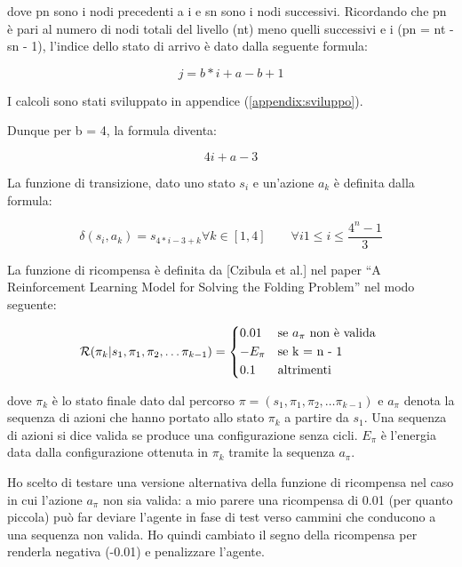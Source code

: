 \documentclass[conference]{IEEEtran}
\begin{document}
dove pn sono i nodi precedenti a i e sn sono i nodi successivi. Ricordando che pn è pari al numero di nodi totali del livello (nt) meno quelli successivi e i (pn = nt - sn - 1), l'indice dello stato di arrivo è dato dalla seguente formula:

\begin{equation}
j = b*i + a - b + 1
\end{equation}

I calcoli sono stati sviluppato in appendice (\ref{appendix:sviluppo}).

Dunque per b = 4, la formula diventa:

\begin{equation}
\tag{Funzione di transizione}
4i + a - 3
\end{equation}

La funzione di transizione, dato uno stato $s_i$ e un'azione $a_k$ è definita dalla formula:

\begin{equation}
\delta(s_i, a_k) = s_{4*i - 3 + k} \forall k \in [1,4] \qquad \forall i 1 \leq i \leq \frac{4^n - 1}{3}
\end{equation}

La funzione di ricompensa è definita da [Czibula et al.] nel paper ``A Reinforcement Learning Model for Solving the Folding Problem'' nel modo seguente:

\begin{equation}
    \label{eq:rew}
    \mathcal{R}(\pi_k| s_1, \pi_1, \pi_2, \dots \pi_{k-1}) =
    \begin{cases*}
      0.01 & se $a_{\pi}$ non è valida \\
      - E_{\pi} & se k = n - 1 \\
      0.1 & altrimenti
    \end{cases*}
\end{equation}

dove $\pi_k$ è lo stato finale dato dal percorso $\pi = (s_1, \pi_1, \pi_2, \dots \pi_{k-1})$ e $a_{\pi}$ denota la sequenza di azioni che hanno portato allo stato $\pi_k$ a partire da $s_1$. Una sequenza di azioni si dice valida se produce una configurazione senza cicli. $E_{\pi}$ è l'energia data dalla configurazione ottenuta in $\pi_k$ tramite la sequenza $a_{\pi}$.

Ho scelto di testare una versione alternativa della funzione di ricompensa nel caso in cui l'azione $a_{\pi}$ non sia valida: a mio parere una ricompensa di 0.01 (per quanto piccola) può far deviare l'agente in fase di test verso cammini che conducono a una sequenza non valida. Ho quindi cambiato il segno della ricompensa per renderla negativa (-0.01) e penalizzare l'agente.
\end{document}
